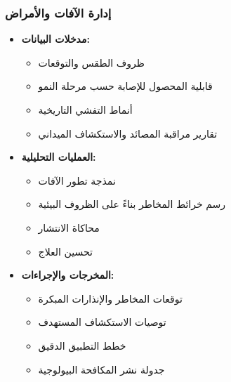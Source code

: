 \subsubsection{إدارة الآفات والأمراض}
\begin{itemize}
    \item \textbf{مدخلات البيانات:}
    \begin{itemize}
        \item ظروف الطقس والتوقعات
        \item قابلية المحصول للإصابة حسب مرحلة النمو
        \item أنماط التفشي التاريخية
        \item تقارير مراقبة المصائد والاستكشاف الميداني
    \end{itemize}
    
    \item \textbf{العمليات التحليلية:}
    \begin{itemize}
        \item نمذجة تطور الآفات
        \item رسم خرائط المخاطر بناءً على الظروف البيئية
        \item محاكاة الانتشار
        \item تحسين العلاج
    \end{itemize}
    
    \item \textbf{المخرجات والإجراءات:}
    \begin{itemize}
        \item توقعات المخاطر والإنذارات المبكرة
        \item توصيات الاستكشاف المستهدف
        \item خطط التطبيق الدقيق
        \item جدولة نشر المكافحة البيولوجية
    \end{itemize}
\end{itemize}

